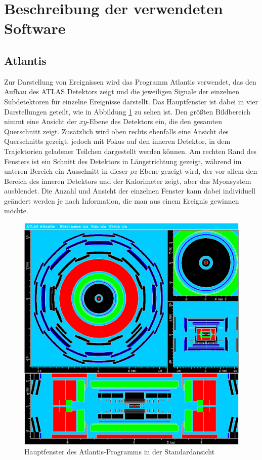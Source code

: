 \documentclass[11pt, a4paper]{article}
\numberwithin{equation}{section}
\begin{document}
\section{Beschreibung der verwendeten Software}

\subsection{Atlantis}

Zur Darstellung von Ereignissen wird das Programm Atlantis verwendet, das den Aufbau des ATLAS Detektors zeigt und die jeweiligen Signale der einzelnen Subdetektoren für einzelne Ereignisse darstellt.
Das Hauptfenster ist dabei in vier Darstellungen geteilt, wie in Abbildung \ref{fig:atlantis} zu sehen ist.
Den größten Bildbereich nimmt eine Ansicht der $xy$-Ebene des Detektors ein, die den gesamten Querschnitt zeigt.
Zusätzlich wird oben rechts ebenfalls eine Ansicht des Querschnitts gezeigt, jedoch mit Fokus auf den inneren Detektor, in dem Trajektorien geladener Teilchen dargestellt werden können. Am rechten Rand des Fensters ist ein Schnitt des Detektors in Längstrichtung gezeigt, während im unteren Bereich ein Ausschnitt in dieser $\rho z$-Ebene gezeigt wird, der vor allem den Bereich des inneren Detektors und der Kalorimeter zeigt, aber das Myonsystem ausblendet.
Die Anzahl und Ansicht der einzelnen Fenster kann dabei individuell geändert werden je nach Information, die man aus einem Ereignis gewinnen möchte.
\begin{figure}[htbp]
	\centering
	\includegraphics[width=\textwidth]{./data/atlantis/atlantis_empty.png}
	\caption{Hauptfenster des Atlantis-Programms in der Standardansicht}
	\label{fig:atlantis}
\end{figure}
\end{document}
